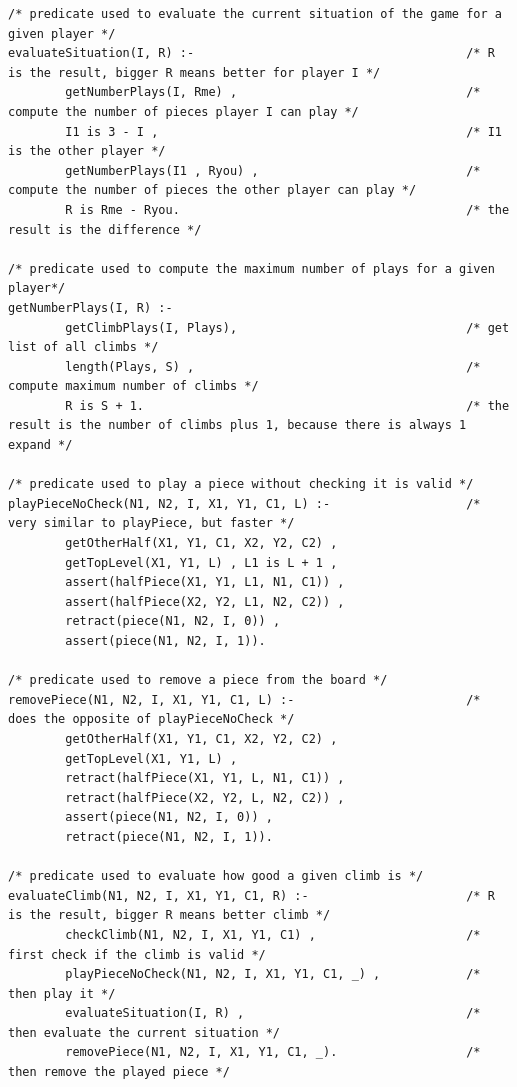 \documentclass[a4paper]{article}
\begin{document}
\begin{lstlisting}
/* predicate used to evaluate the current situation of the game for a given player */
evaluateSituation(I, R) :-                                      /* R is the result, bigger R means better for player I */
        getNumberPlays(I, Rme) ,                                /* compute the number of pieces player I can play */
        I1 is 3 - I ,                                           /* I1 is the other player */
        getNumberPlays(I1 , Ryou) ,                             /* compute the number of pieces the other player can play */
        R is Rme - Ryou.                                        /* the result is the difference */

/* predicate used to compute the maximum number of plays for a given player*/
getNumberPlays(I, R) :- 
        getClimbPlays(I, Plays),                                /* get list of all climbs */
        length(Plays, S) ,                                      /* compute maximum number of climbs */
        R is S + 1.                                             /* the result is the number of climbs plus 1, because there is always 1 expand */

/* predicate used to play a piece without checking it is valid */
playPieceNoCheck(N1, N2, I, X1, Y1, C1, L) :-                   /* very similar to playPiece, but faster */
        getOtherHalf(X1, Y1, C1, X2, Y2, C2) , 
        getTopLevel(X1, Y1, L) , L1 is L + 1 , 
        assert(halfPiece(X1, Y1, L1, N1, C1)) , 
        assert(halfPiece(X2, Y2, L1, N2, C2)) , 
        retract(piece(N1, N2, I, 0)) , 
        assert(piece(N1, N2, I, 1)).

/* predicate used to remove a piece from the board */
removePiece(N1, N2, I, X1, Y1, C1, L) :-                        /* does the opposite of playPieceNoCheck */
        getOtherHalf(X1, Y1, C1, X2, Y2, C2) , 
        getTopLevel(X1, Y1, L) , 
        retract(halfPiece(X1, Y1, L, N1, C1)) , 
        retract(halfPiece(X2, Y2, L, N2, C2)) , 
        assert(piece(N1, N2, I, 0)) , 
        retract(piece(N1, N2, I, 1)).

/* predicate used to evaluate how good a given climb is */
evaluateClimb(N1, N2, I, X1, Y1, C1, R) :-                      /* R is the result, bigger R means better climb */
        checkClimb(N1, N2, I, X1, Y1, C1) ,                     /* first check if the climb is valid */
        playPieceNoCheck(N1, N2, I, X1, Y1, C1, _) ,            /* then play it */
        evaluateSituation(I, R) ,                               /* then evaluate the current situation */
        removePiece(N1, N2, I, X1, Y1, C1, _).                  /* then remove the played piece */


\end{lstlisting}
\end{document}
